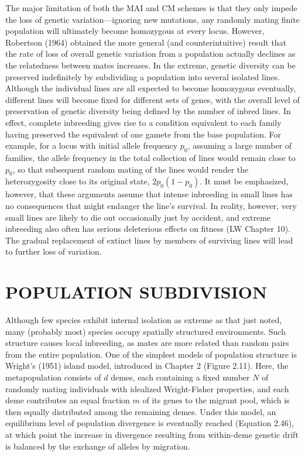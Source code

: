 \documentclass{article}
\begin{document}
The major limitation of both the MAI and CM schemes is that they only impede the loss of genetic variation—ignoring new mutations, any randomly mating finite population will ultimately become homozygous at every locus. However, Robertson (1964) obtained the more general (and counterintuitive) result that the rate of loss of overall genetic variation from a population actually declines as the relatedness between mates increases. In the extreme, genetic diversity can be preserved indefinitely by subdividing a population into several isolated lines. Although the individual lines are all expected to become homozygous eventually, different lines will become fixed for different sets of genes, with the overall level of preservation of genetic diversity being defined by the number of inbred lines. In effect, complete inbreeding gives rise to a condition equivalent to each family having preserved the equivalent of one gamete from the base population. For example, for a locus with initial allele frequency  $ p_{0} $, assuming a large number of families, the allele frequency in the total collection of lines would remain close to  $ p_{0} $, so that subsequent random mating of the lines would render the heterozygosity close to its original state,  $ 2p_{0}(1 - p_{0}) $. It must be emphasized, however, that these arguments assume that intense inbreeding in small lines has no consequences that might endanger the line's survival. In reality, however, very small lines are likely to die out occasionally just by accident, and extreme inbreeding also often has serious deleterious effects on fitness (LW Chapter 10). The gradual replacement of extinct lines by members of surviving lines will lead to further loss of variation.

\section{POPULATION SUBDIVISION}
Although few species exhibit internal isolation as extreme as that just noted, many (probably most) species occupy spatially structured environments. Such structure causes local inbreeding, as mates are more related than random pairs from the entire population. One of the simplest models of population structure is Wright's (1951) island model, introduced in Chapter 2 (Figure 2.11). Here, the metapopulation consists of  $ d $ demes, each containing a fixed number  $ N $ of randomly mating individuals with idealized Wright-Fisher properties, and each deme contributes an equal fraction  $ m $ of its genes to the migrant pool, which is then equally distributed among the remaining demes. Under this model, an equilibrium level of population divergence is eventually reached (Equation 2.46), at which point the increase in divergence resulting from within-deme genetic drift is balanced by the exchange of alleles by migration.
\end{document}
